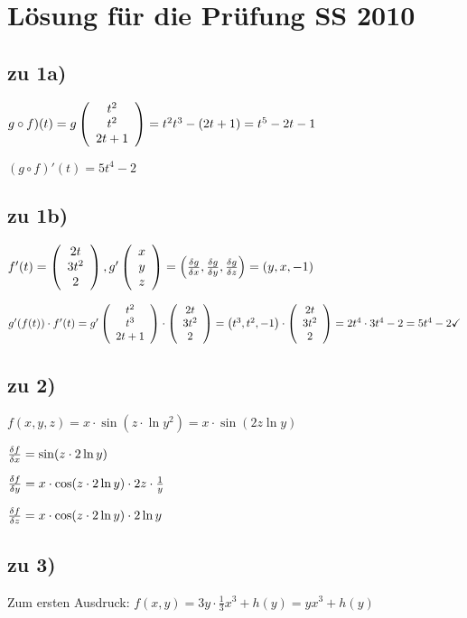 \renewcommand{\ldate}{2016-01-07}
%

\section{Lösung für die Prüfung SS 2010}

\subsection{zu 1a)}
$ g\circ f) (t) = g  \left(  \begin{array}{c} t^2\\t^2\\2t+1 \end{array}  \right)   = t^2 t^3 - (2t+1) = t^5 - 2t - 1$

$ (g\circ f)' (t) = 5 t^4 - 2$

\subsection{zu 1b)}
$ f'(t) =   \left(  \begin{array}{c} 2t\\3 t^2\\2 \end{array}  \right)  , g'  \left(  \begin{array}{c} x\\y\\z \end{array}  \right)   =  \left( \frac{\delta g}{\delta x},\frac{\delta g}{\delta y},\frac{\delta g}{\delta z} \right)  =  \left( y,x,-1 \right)  $

$g'(f(t)) \cdot f'(t) = g'   \left(  \begin{array}{c} t^2\\t^3\\2t+1 \end{array}  \right)   \cdot   \left(  \begin{array}{c} 2t\\3t^2\\2 \end{array}  \right)   =  \left( t^3, t^2, -1 \right)  \cdot   \left(  \begin{array}{c} 2t\\3t^2\\2 \end{array}  \right)   = 2t^4 \cdot 3t^4 - 2 = 5t^4 - 2 \checkmark$

\subsection{zu 2)}
$ f(x,y,z) = x\cdot \sin (z\cdot \ln y^2) = x \cdot \sin (2z \ln y)$

$ \frac{\delta f}{\delta x} = \sin(z\cdot 2 \ln y)$

$\frac{\delta f}{\delta y} = x\cdot \cos (z\cdot 2 \ln y) \cdot 2z \cdot \frac{1}{y} $

$\frac{\delta f}{\delta z} = x\cdot \cos (z\cdot 2 \ln y) \cdot 2 \ln y$

\subsection{zu 3)}
Zum ersten Ausdruck: 
$ f(x,y) = 3y \cdot \frac{1}{3} x^3 + h(y) = yx^3 + h(y) $

